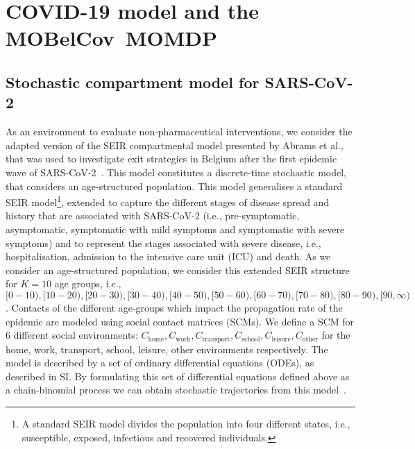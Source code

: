 \documentclass{article}
\renewcommand{\cite}[1]{\citep{#1}}
\newcommand{\chome}{C_{\text{home}}}
\newcommand{\cwork}{C_{\text{work}}}
\newcommand{\ctransport}{C_{\text{transport}}}
\newcommand{\cschool}{C_{\text{school}}}
\newcommand{\cleisure}{C_{\text{leisure}}}
\newcommand{\cother}{C_{\text{other}}}
\newcommand{\momdpname}{MOBelCov}
\newcommand{\agegroups}{K}
\begin{document}
\section{COVID-19 model and the \momdpname\  MOMDP}
\label{sec:sars-cov2-momdp}
\subsection{Stochastic compartment model for SARS-CoV-2}
\label{sec:sars-cov2-momdp_model}
As an environment to evaluate non-pharmaceutical interventions, we consider the adapted version of the SEIR compartmental model presented by Abrams et al., that was used to investigate exit strategies in Belgium after the first epidemic wave of SARS-CoV-2~\cite{abrams2021modelling}. This model constitutes a discrete-time stochastic model, that considers an age-structured population. This model generalises a standard SEIR model\footnote{A standard SEIR model divides the population into four different states, i.e., susceptible, exposed, infectious and recovered individuals.}, extended to capture the different stages of disease spread and history that are associated with SARS-CoV-2 (i.e., pre-symptomatic, asymptomatic, symptomatic with mild symptoms and symptomatic with severe symptoms) and to represent the stages associated with severe disease, i.e., hospitalisation, admission to the intensive care unit (ICU) and death. 
As we consider an age-structured population, we consider this extended SEIR structure for $\agegroups = 10$ age groups,  i.e., $[0-10), [10-20), [20-30), [30-40), [40-50), [50-60), [60-70), [70-80), [80-90), [90,\infty)$. Contacts of the different age-groups which impact the propagation rate of the epidemic are modeled using social contact matrices (SCMs). We define a SCM for 6 different social environments: $\chome, \cwork, \ctransport, \cschool, \cleisure, \cother$ for the home, work, transport, school, leisure, other environments respectively.
The model is described by a set of ordinary differential equations (ODEs), as described in SI.
By formulating this set of differential equations defined above as a chain-binomial process we can obtain stochastic trajectories from this model~\cite{abrams2021modelling}.
\end{document}
